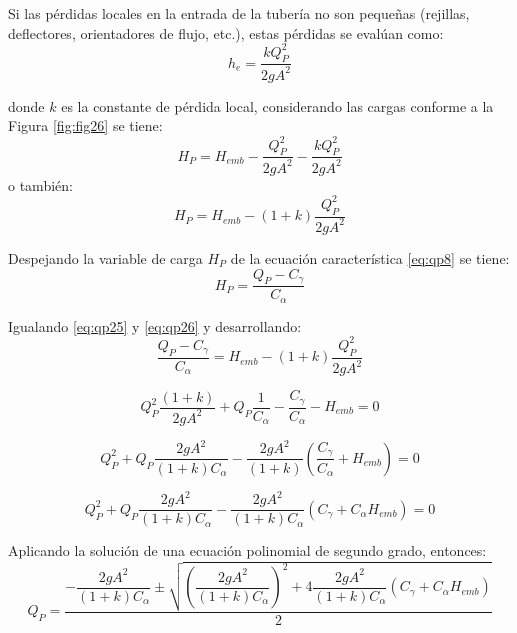 \documentclass[letterpaper]{report}
\begin{document}
Si las pérdidas locales en la entrada de la tubería no son pequeñas (rejillas, deflectores, orientadores de flujo, etc.), estas pérdidas se evalúan como:
\begin{equation}
	h_e=\frac{kQ_P^2}{2gA^2}
\end{equation}

donde $k$ es la constante de pérdida local, considerando las cargas conforme a la Figura \ref{fig:fig26} se tiene:
\begin{equation*}
	H_P=H_{emb}-\frac{Q_P^2}{2gA^2}-\frac{kQ_P^2}{2gA^2}
\end{equation*}
o también:
\begin{equation}
	H_P=H_{emb}-(1+k)\dfrac{Q_P^2}{2gA^2}
\label{eq:qp25}	
\end{equation}

Despejando la variable de carga $H_P$ de la ecuación característica \ref{eq:qp8} se tiene:
\begin{equation}
	H_P=\dfrac{Q_P-C_\gamma}{C_\alpha}
\label{eq:qp26}
\end{equation}

Igualando \ref{eq:qp25} y \ref{eq:qp26} y desarrollando:
\begin{equation*}
	\frac{Q_P-C_\gamma}{C_\alpha}=H_{emb}-\left(1+k\right)\frac{Q_P^2}{2gA^2}
\end{equation*}

\begin{equation*}
	Q_P^2\frac{\left(1+k\right)}{2gA^2}+Q_P\frac{1}{C_\alpha}-\frac{C_\gamma}{C_\alpha}-H_{emb}=0
\end{equation*}

\begin{equation*}
	Q_P^2+Q_P\frac{2gA^2}{\left(1+k\right)C_\alpha}-\frac{2gA^2}{\left(1+k\right)}\left(\frac{C_\gamma}{C_\alpha}+H_{emb}\right)=0
\end{equation*}

\begin{equation*}
	Q_P^2+Q_P\frac{2gA^2}{\left(1+k\right)C_\alpha}-\frac{2gA^2}{\left(1+k\right)C_\alpha}\left(C_\gamma+C_\alpha H_{emb}\right)=0
\end{equation*}

Aplicando la solución de una ecuación polinomial de segundo grado, entonces:
\begin{equation*}
	Q_P=\dfrac{-\dfrac{2gA^2}{\left(1+k\right)C_\alpha}\pm\sqrt{\left(\dfrac{2gA^2}{\left(1+k\right)C_\alpha}\right)^2+4\dfrac{2gA^2}{\left(1+k\right)C_\alpha}\left(C_\gamma+C_\alpha H_{emb}\right)}}{2}
\end{equation*}
\end{document}
